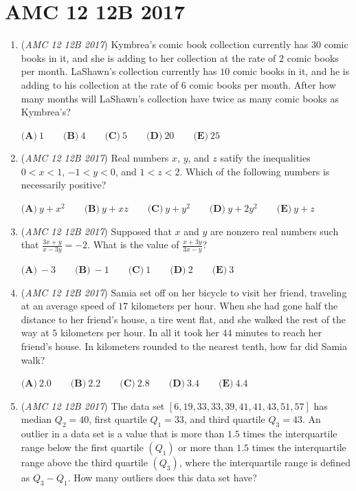 \section{AMC 12 12B 2017}
        \begin{enumerate}
        	\item (\textit{AMC 12 12B 2017}) Kymbrea's comic book collection currently has $30$ comic books in it, and she is adding to her collection at the rate of $2$ comic books per month. LaShawn's collection currently has $10$ comic books in it, and he is adding to his collection at the rate of $6$ comic books per month. After how many months will LaShawn's collection have twice as many comic books as Kymbrea's?


 $\textbf{(A)}\ 1\qquad\textbf{(B)}\ 4\qquad\textbf{(C)}\ 5\qquad\textbf{(D)}\ 20\qquad\textbf{(E)}\ 25$


	\item (\textit{AMC 12 12B 2017}) Real numbers $x$, $y$, and $z$ satify the inequalities
$0<x<1$, $-1<y<0$, and $1<z<2$.
Which of the following numbers is necessarily positive?


 $\textbf{(A)}\ y+x^2\qquad\textbf{(B)}\ y+xz\qquad\textbf{(C)}\ y+y^2\qquad\textbf{(D)}\ y+2y^2\qquad\textbf{(E)}\ y+z$


	\item (\textit{AMC 12 12B 2017}) Supposed that $x$ and $y$ are nonzero real numbers such that $\frac{3x+y}{x-3y}=-2$. What is the value of $\frac{x+3y}{3x-y}$?


 $\textbf{(A)}\ -3\qquad\textbf{(B)}\ -1\qquad\textbf{(C)}\ 1\qquad\textbf{(D)}\ 2\qquad\textbf{(E)}\ 3$


	\item (\textit{AMC 12 12B 2017}) Samia set off on her bicycle to visit her friend, traveling at an average speed of $17$ kilometers per hour. When she had gone half the distance to her friend's house, a tire went flat, and she walked the rest of the way at $5$ kilometers per hour. In all it took her $44$ minutes to reach her friend's house. In kilometers rounded to the nearest tenth, how far did Samia walk?


 $\textbf{(A)}\ 2.0\qquad\textbf{(B)}\ 2.2\qquad\textbf{(C)}\ 2.8\qquad\textbf{(D)}\ 3.4\qquad\textbf{(E)}\ 4.4$


	\item (\textit{AMC 12 12B 2017}) The data set $[6,19,33,33,39,41,41,43,51,57]$ has median $Q_2 = 40$, first quartile $Q_1 = 33$, and third quartile $Q_3=43$. An outlier in a data set is a value that is more than $1.5$ times the interquartile range below the first quartile $(Q_1)$ or more than $1.5$ times the interquartile range above the third quartile $(Q_3)$, where the interquartile range is defined as $Q_3 - Q_1$. How many outliers does this data set have?



\end{enumerate}
